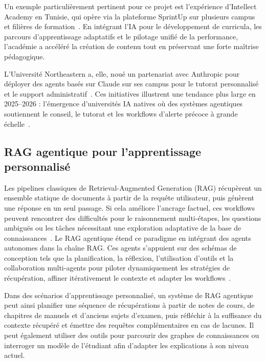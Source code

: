 Un exemple particulièrement pertinent pour ce projet est l'expérience d'Intellect
Academy en Tunisie, qui opère via la plateforme SprintUp sur plusieurs campus et
filières de formation~\cite{intellect2025}. En intégrant l'IA pour le développement de
curricula, les parcours d'apprentissage adaptatifs et le pilotage unifié de la
performance, l'académie a accéléré la création de contenu tout en préservant une forte
maîtrise pédagogique.

L'Université Northeastern a, elle, noué un partenariat avec Anthropic pour déployer des
agents basés sur Claude sur ses campus pour le tutorat personnalisé et le support
administratif~\cite{northeastern2025,duke2025}. Ces initiatives illustrent une tendance
plus large en 2025--2026 : l'émergence d'universités \og{}IA natives\fg{} où des
systèmes agentiques soutiennent le conseil, le tutorat et les workflows d'alerte
précoce à grande échelle~\cite{agenticragsurvey,agenticrag2025}.

\subsection{RAG agentique pour l'apprentissage personnalisé}

Les pipelines classiques de Retrieval-Augmented Generation (RAG) récupèrent un ensemble
statique de documents à partir de la requête utilisateur, puis génèrent une réponse en
un seul passage. Si cela améliore l'ancrage factuel, ces workflows peuvent rencontrer
des difficultés pour le raisonnement multi-étapes, les questions ambiguës ou les tâches
nécessitant une exploration adaptative de la base de
connaissances~\cite{lewis2020,rageducation}. Le RAG agentique étend ce paradigme en
intégrant des agents autonomes dans la chaîne RAG. Ces agents s'appuient sur des
schémas de conception tels que la planification, la réflexion, l'utilisation d'outils
et la collaboration multi-agents pour piloter dynamiquement les stratégies de
récupération, affiner itérativement le contexte et adapter les
workflows~\cite{agenticragsurvey}.

Dans des scénarios d'apprentissage personnalisé, un système de RAG
agentique peut ainsi planifier une séquence de récupérations à
partir de notes de cours, de chapitres de manuels et d'anciens
sujets d'examen, puis réfléchir à la suffisance du contexte
récupéré et émettre des requêtes complémentaires en cas de lacunes.
Il peut également utiliser des outils pour parcourir des graphes
de connaissances ou interroger un modèle de l'étudiant afin
d'adapter les explications à son niveau actuel.

